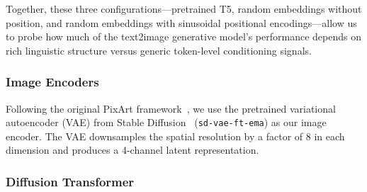 \documentclass[10pt,twocolumn,letterpaper]{article}
\begin{document}

Together, these three configurations---pretrained T5, random embeddings without position, and random embeddings with sinusoidal positional encodings---allow us to probe how much of the text2image generative model’s performance depends on rich linguistic structure versus generic token-level conditioning signals.

\subsubsection{Image Encoders}
Following the original PixArt framework~\cite{chen2023PixArtAlpha}, we use the pretrained variational autoencoder (VAE) from Stable Diffusion~\cite{rombach2022latentdiff} (\texttt{sd-vae-ft-ema}) as our image encoder. The VAE downsamples the spatial resolution by a factor of $8$ in each dimension and produces a 4-channel latent representation. %

\subsubsection{Diffusion Transformer}
\end{document}
